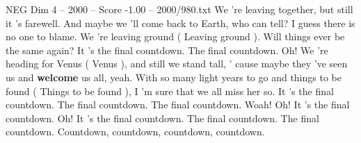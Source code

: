 \begin{textsample}{NEG Dim 4 – 2000 – Score -1.00 – 2000/980.txt}  \label{ex:f4_neg_035}
We 're leaving together, but still it 's farewell.
And maybe we 'll come back to Earth, who can tell?
I guess there is no one to blame.
We 're leaving ground ( Leaving ground ).
Will things ever be the same again?
It 's the final countdown.
The final countdown.
Oh!
We 're heading for Venus ( Venus ), and still we stand tall, ' cause maybe they 've seen us and \textbf{welcome} us all, yeah.
With so many light years to go and things to be found ( Things to be found ), I 'm sure that we all miss her so.
It 's the final countdown.
The final countdown.
The final countdown.
Woah!
Oh!
It 's the final countdown.
Oh!
It 's the final countdown.
The final countdown.
The final countdown.
Countdown, countdown, countdown, countdown.

\end{textsample}

